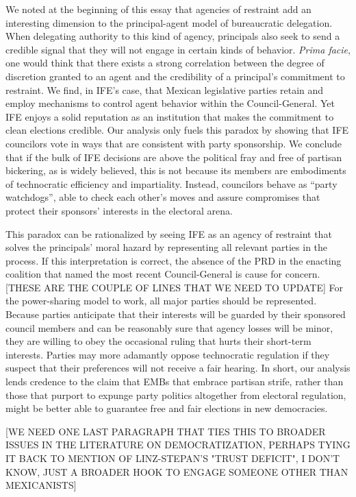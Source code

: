 \documentclass[12 pt]{article}
\begin{document}
We noted at the beginning of this essay that agencies of restraint add an interesting dimension to the principal-agent model of bureaucratic delegation.  When delegating authority to this kind of agency, principals also seek to send a credible signal that they will not engage in certain kinds of behavior.  \emph{Prima facie}, one would think that there exists a strong correlation between the degree of discretion granted to an agent and the credibility of a principal's commitment to restraint.  We find, in IFE's case, that Mexican legislative parties retain and employ mechanisms to control agent behavior within the Council-General.  Yet IFE enjoys a solid reputation as an institution that makes the commitment to clean elections credible.  Our analysis only fuels this paradox by showing that IFE councilors vote in ways that are consistent with party sponsorship.  We conclude that if the bulk of IFE decisions are above the political fray and free of partisan bickering, as is widely believed, this is not because its members are embodiments of technocratic efficiency and impartiality.  Instead, councilors behave as ``party watchdogs'', able to check each other's moves and assure compromises that protect their sponsors' interests in the electoral arena.

This paradox can be rationalized by seeing IFE as an agency of restraint that solves the principals' moral hazard by representing all relevant parties in the process.  If this interpretation is correct, the absence of the PRD in the enacting coalition that named the most recent Council-General is cause for concern.  [THESE ARE THE COUPLE OF LINES THAT WE NEED TO UPDATE] For the power-sharing model to work, all major parties should be represented.  Because parties anticipate that their interests will be guarded by their sponsored council members and can be reasonably sure that agency losses will be minor, they are willing to obey the occasional ruling that hurts their short-term interests.  Parties may more adamantly oppose technocratic regulation if they suspect that their preferences will not receive a fair hearing.  In short, our analysis lends credence to the claim that EMBs that embrace partisan strife, rather than those that purport to expunge party politics altogether from electoral regulation, might be better able to guarantee free and fair elections in new democracies.

[WE NEED ONE LAST PARAGRAPH THAT TIES THIS TO BROADER ISSUES IN THE LITERATURE ON DEMOCRATIZATION, PERHAPS TYING IT BACK TO MENTION OF LINZ-STEPAN'S "TRUST DEFICIT", I DON'T KNOW, JUST A BROADER HOOK TO ENGAGE SOMEONE OTHER THAN MEXICANISTS]
\end{document}
